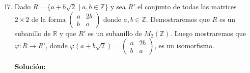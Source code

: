 \begin{enumerate}
    \setcounter{enumi}{16}
    \item Dado \( R = \{a + b\sqrt{2} \mid a, b \in \mathbb{Z}\} \) y sea \( R' \) el conjunto de todas las matrices \( 2 \times 2 \) de la forma \( \begin{pmatrix} a & 2b \\ b & a \end{pmatrix} \) donde \( a, b \in \mathbb{Z} \). Demostraremos que \( R \) es un subanillo de \( \mathbb{R} \) y que \( R' \) es un subanillo de \( M_2(\mathbb{Z}) \). Luego mostraremos que \( \varphi : R \to R' \), donde \( \varphi(a + b\sqrt{2}) = \begin{pmatrix} a & 2b \\ b & a \end{pmatrix} \), es un isomorfismo.
    
    \textbf{Solución:}
    

\end{enumerate}
